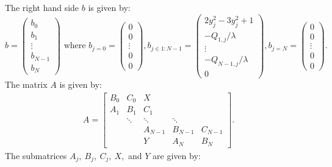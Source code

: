 \documentclass[reqno, 12pt]{amsart}
\begin{document}
    The right hand side $b$ is given by:
    \begin{equation*}
        b = \begin{pmatrix} b_0 \\ b_1 \\ \vdots \\ b_{N-1} \\ b_N \end{pmatrix} \text{ where }
        b_{j = 0} = \begin{pmatrix} 0 \\ 0 \\ \vdots \\ 0 \\ 0 \end{pmatrix},
        b_{j \in 1:N-1} = \begin{pmatrix} 2y_j^2 - 3y_j^2 + 1 \\ -Q_{1,j}/\lambda \\ \vdots \\ -Q_{N-1,j}/\lambda \\ 0 \end{pmatrix},
        b_{j = N} = \begin{pmatrix} 0 \\ 0 \\ \vdots \\ 0 \\ 0 \end{pmatrix}.
    \end{equation*}
    The matrix $A$ is given by:
    \begin{gather}
        A = \begin{bmatrix} B_0 & C_0 & X \\ 
                            A_1 & B_1 & C_1 \\
                                & \ddots & \ddots & \ddots \\
                                && A_{N-1} & B_{N-1} & C_{N-1} \\
                                &&     Y    & A_N & B_{N}
                        \end{bmatrix}.
    \end{gather}
    The submatrices $A_j,\ B_j,\ C_j,\ X,$ and $Y$ are given by:
\end{document}
